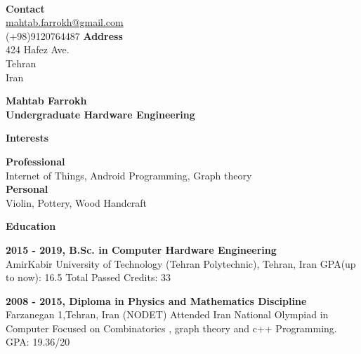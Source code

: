 \documentclass[a4paper,12pt,final]{memoir}
\newcommand{\Sep}{\vspace{1.5em}}
\newcommand{\SmallSep}{\vspace{0.5em}}
\newenvironment{AboutMe}
	{\ignorespaces\textbf{\color{RoyalBlue} About me}}
	{\Sep\ignorespacesafterend}
\newcommand{\CVSection}[1]
	{\Large\textbf{#1}\par
	\SmallSep\normalsize\normalfont}
\newcommand{\CVItem}[1]
	{\textbf{\color{RoyalBlue} #1}}
\begin{document}


\begin{flushright}\small

	
	 \CVItem{\\ Contact} \\
	 
	\url{mahtab.farrokh@gmail.com}  \\
	(+98)9120764487 
	\CVItem{Address} \\
	424 Hafez Ave. \\
	Tehran\\
	Iran
	
\end{flushright}\normalsize
\framebreak


\Huge\bfseries {\color{RoyalBlue} Mahtab Farrokh} \\
\Large\bfseries  Undergraduate Hardware Engineering \\

\normalsize\normalfont


\CVSection{Interests}
	\CVItem{Professional}
	\\
	Internet of Things, Android Programming, Graph theory
	\\
	\CVItem{Personal}
	\\
	Violin, Pottery, Wood Handcraft
	
\Sep

\CVSection{Education}
\CVItem{2015 - 2019, B.Sc. in Computer Hardware Engineering}\\
AmirKabir University of Technology (Tehran Polytechnic), Tehran, Iran
GPA(up to now): 16.5
Total Passed Credits: 33
\SmallSep

\CVItem{2008 - 2015, Diploma in Physics and Mathematics Discipline}\\
Farzanegan 1,Tehran, Iran (NODET)
Attended Iran National Olympiad in Computer Focused on Combinatorics
, graph theory and c++ Programming.
GPA: 19.36/20
\Sep
\end{document}
